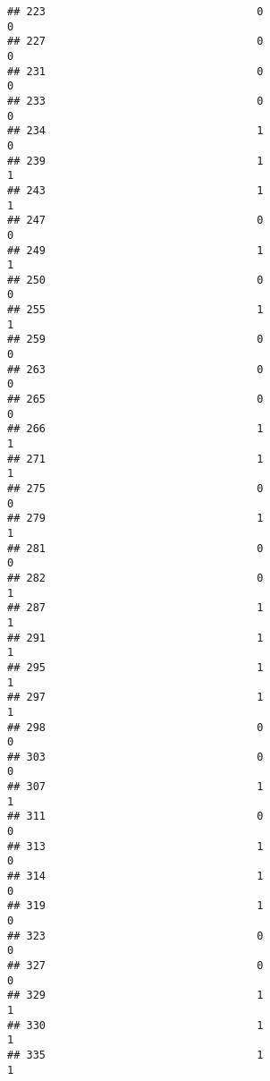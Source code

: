 \documentclass[
]{article}
\begin{document}
\begin{verbatim}
## 223                                 0                                0
## 227                                 0                                0
## 231                                 0                                0
## 233                                 0                                0
## 234                                 1                                0
## 239                                 1                                1
## 243                                 1                                1
## 247                                 0                                0
## 249                                 1                                1
## 250                                 0                                0
## 255                                 1                                1
## 259                                 0                                0
## 263                                 0                                0
## 265                                 0                                0
## 266                                 1                                1
## 271                                 1                                1
## 275                                 0                                0
## 279                                 1                                1
## 281                                 0                                0
## 282                                 0                                1
## 287                                 1                                1
## 291                                 1                                1
## 295                                 1                                1
## 297                                 1                                1
## 298                                 0                                0
## 303                                 0                                0
## 307                                 1                                1
## 311                                 0                                0
## 313                                 1                                0
## 314                                 1                                0
## 319                                 1                                0
## 323                                 0                                0
## 327                                 0                                0
## 329                                 1                                1
## 330                                 1                                1
## 335                                 1                                1

\end{verbatim}
\end{document}
